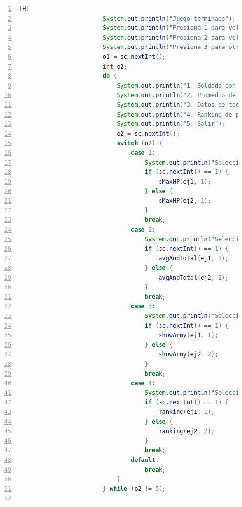 \documentclass{article}
\begin{document}
\begin{lstlisting}[language=java,caption={Método main Final}, numbers=left][H]
                        System.out.println("Juego terminado");
                        System.out.println("Presiona 1 para volver al menu principal");
                        System.out.println("Presiona 2 para volver a jugar");
                        System.out.println("Presiona 3 para otras opciones: ");
                        o1 = sc.nextInt();
                        int o2;
                        do {
                            System.out.println("1. Soldado con mayor vida");
                            System.out.println("2. Promedio de vida y total");
                            System.out.println("3. Datos de todos los soldados");
                            System.out.println("4. Ranking de poder");
                            System.out.println("5. Salir");
                            o2 = sc.nextInt();
                            switch (o2) {
                                case 1:
                                    System.out.println("Seleccione ejercito: ");
                                    if (sc.nextInt() == 1) {
                                        sMaxHP(ej1, 1);
                                    } else {
                                        sMaxHP(ej2, 2);
                                    }
                                    break;
                                case 2:
                                    System.out.println("Seleccione ejercito: ");
                                    if (sc.nextInt() == 1) {
                                        avgAndTotal(ej1, 1);
                                    } else {
                                        avgAndTotal(ej2, 2);
                                    }
                                    break;
                                case 3:
                                    System.out.println("Seleccione ejercito: ");
                                    if (sc.nextInt() == 1) {
                                        showArmy(ej1, 1);
                                    } else {
                                        showArmy(ej2, 2);
                                    }
                                    break;
                                case 4:
                                    System.out.println("Seleccione ejercito: ");
                                    if (sc.nextInt() == 1) {
                                        ranking(ej1, 1);
                                    } else {
                                        ranking(ej2, 2);
                                    }
                                    break;
                                default:
                                    break;
                            }
                        } while (o2 != 5);


\end{lstlisting}
\end{document}

